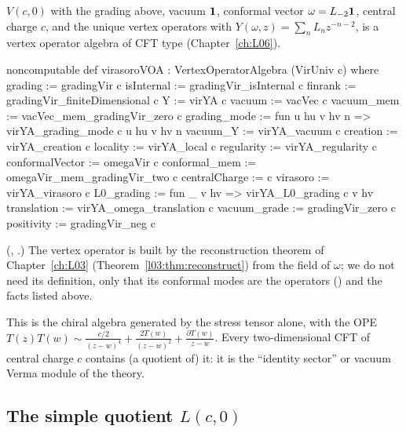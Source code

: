 \begin{definition}\label{l07:def:virVOA}
$V(c,0)$ with the grading above, vacuum $\mathbf{1}$, conformal vector $\omega = L_{-2}\mathbf{1}$, central
charge $c$, and the unique vertex operators with $Y(\omega,z) = \sum_nL_nz^{-n-2}$, is a vertex operator
algebra of CFT type (Chapter~\ref{ch:L06}).
\end{definition}
\begin{leancode}
noncomputable def virasoroVOA : VertexOperatorAlgebra (VirUniv c) where
  grading := gradingVir c
  isInternal := gradingVir_isInternal c
  finrank := gradingVir_finiteDimensional c
  Y := virYA c
  vacuum := vacVec c
  vacuum_mem := vacVec_mem_gradingVir_zero c
  grading_mode := fun u hu v hv n => virYA_grading_mode c u hu v hv n
  vacuum_Y := virYA_vacuum c
  creation := virYA_creation c
  locality := virYA_local c
  regularity := virYA_regularity c
  conformalVector := omegaVir c
  conformal_mem := omegaVir_mem_gradingVir_two c
  centralCharge := c
  virasoro := virYA_virasoro c
  L0_grading := fun {_} v hv => virYA_L0_grading c v hv
  translation := virYA_omega_translation c
  vacuum_grade := gradingVir_zero c
  positivity := gradingVir_neg c
\end{leancode}
(, .) The
vertex operator  is built by the reconstruction theorem of Chapter~\ref{ch:L03}
(Theorem~\ref{l03:thm:reconstruct}) from the field of $\omega$; we do not need its definition, only
that its conformal modes are the operators  () and the
facts listed above.

\begin{physics}
This is the chiral algebra generated by the stress tensor alone, with the OPE $T(z)T(w)\sim
\frac{c/2}{(z-w)^4}+\frac{2T(w)}{(z-w)^2}+\frac{\partial T(w)}{z-w}$. Every two-dimensional CFT of central charge
$c$ contains (a quotient of) it: it is the ``identity sector'' or vacuum Verma module of the theory.
\end{physics}

\subsection{The simple quotient \texorpdfstring{$L(c,0)$}{L(c,0)}}

